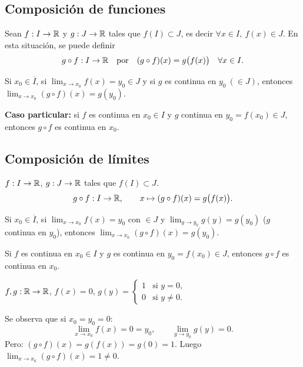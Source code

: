 \documentclass[11pt,a4paper]{article}
\newcommand{\Cl}[1]{\overline{#1}}      %
\begin{document}
\subsection{Composición de funciones}

Sean $f:I\to\mathbb{R}$ y $g:J\to\mathbb{R}$ tales que $f(I)\subset J$, es decir $\forall x\in I,\ f(x)\in J$. En esta situación, se puede definir
\[
  g\circ f:I\to\mathbb{R} \quad\text{por}\quad (g\circ f)(x)=g\big(f(x)\big)\quad\forall x\in I.
\]

\begin{proposicion}
Si $x_0\in\Cl{I}$, si $\displaystyle\lim_{x\to x_0}f(x)=y_0\in J$ y si $g$ es continua en $y_0\ (\in J)$, entonces $\displaystyle\lim_{x\to x_0}(g\circ f)(x)=g(y_0)$.
\end{proposicion}

\textbf{Caso particular:} si $f$ es continua en $x_0\in I$ y $g$ continua en $y_0=f(x_0)\in J$, entonces $g\circ f$ es continua en $x_0$.


\subsection{Composición de límites}

$f:I\to\mathbb{R}$, $g:J\to\mathbb{R}$ tales que $f(I)\subset J$.
\[
  g\circ f:I\to\mathbb{R},\qquad x\mapsto(g\circ f)(x)=g\big(f(x)\big).
\]

\begin{proposicion}
Si $x_0\in\Cl{I}$, si $\displaystyle\lim_{x\to x_0}f(x)=y_0$ con $\in J$ y $\displaystyle\lim_{y\to y_0}g(y)=g(y_0)$ ($g$ continua en $y_0$), entonces $\displaystyle\lim_{x\to x_0}(g\circ f)(x)=g(y_0)$.
\end{proposicion}

\begin{corolario}
Si $f$ es continua en $x_0\in I$ y $g$ es continua en $y_0=f(x_0)\in J$, entonces $g\circ f$ es continua en $x_0$.
\end{corolario}

\begin{contraejemplo}
$f,g:\mathbb{R}\to\mathbb{R}$, \quad $f(x)=0$, \quad $g(y)=\begin{cases}1 & \text{si } y=0,\\ 0 & \text{si } y\neq0.\end{cases}$

Se observa que si $x_0=y_0=0$:
\[
  \lim_{x\to x_0}f(x)=0=y_0,\qquad \lim_{y\to y_0}g(y)=0.
\]
Pero: $(g\circ f)(x)=g(f(x))=g(0)=1$. Luego $\displaystyle\lim_{x\to x_0}(g\circ f)(x)=1\neq0$.
\end{contraejemplo}
\end{document}
